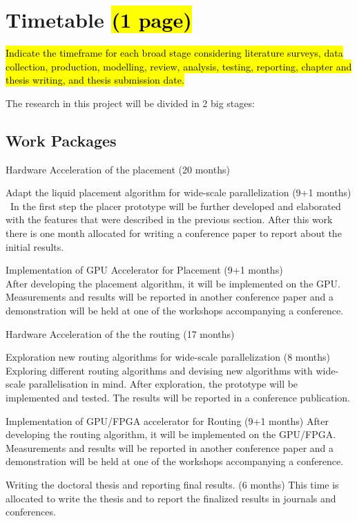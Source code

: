 \documentclass[a4paper,oneside,12pt]{article}
\begin{document}
\newpage

\section{Timetable \hl{(1 page)}}\label{timetable}
\hl{ Indicate the timeframe for each broad stage considering literature surveys, data collection, production, modelling, review, analysis,
testing, reporting, chapter and thesis writing, and thesis submission date.}

The research in this project will be divided in 2 big stages:

\subsection{Work Packages}
\begin{description*}
\item[Hardware Acceleration of the placement (20 months)]\

\begin{description*}
\item[Adapt the liquid placement algorithm for wide-scale parallelization (9+1 months)]\
In the first step the placer prototype will be further developed and elaborated with the features that were described in the previous section. After this work there is one month allocated for writing a conference paper to report about the initial results.
\item[Implementation of GPU Accelerator for Placement (9+1 months)]\
\\After developing the placement algorithm, it will be implemented on the GPU. Measurements and results will be reported in another conference paper and a demonstration will be held at one of the workshops accompanying a conference. 
\end{description*}

\item[Hardware Acceleration of the the routing (17 months)]\

\begin{description*}
\item[Exploration new routing algorithms for wide-scale parallelization (8 months)] 
Exploring different routing algorithms and devising new algorithms with wide-scale parallelisation in mind. After exploration, the prototype will be implemented and tested. The results will be reported in a conference publication.
\item[Implementation of GPU/FPGA accelerator for Routing (9+1 months)]
After developing the routing algorithm, it will be implemented on the GPU/FPGA. Measurements and results will be reported in another conference paper and a demonstration will be held at one of the workshops accompanying a conference. 
\end{description*}

\item[Writing the doctoral thesis and reporting final results. (6 months)] This time is allocated to write the thesis and to report the finalized results in journals and conferences.  

\end{description*}
\end{document}
